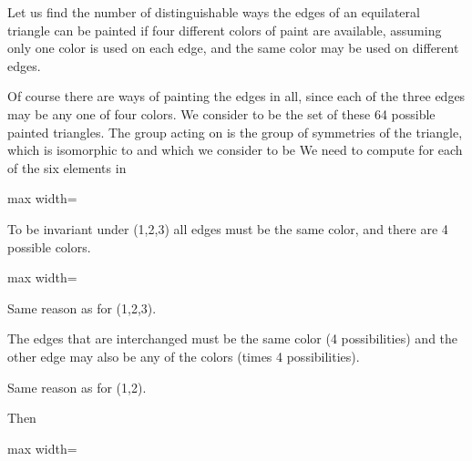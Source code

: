 \documentclass[11pt,oneside]{article}
\begin{document}
\begin{BookBody}

 Let us find the number of distinguishable ways the edges of an equilateral triangle can be painted if four different colors of paint are available, assuming only one color is used on each edge, and the same color may be used on different edges.

Of course there are  ways of painting the edges in all, since each of the three edges may be any one of four colors. We consider  to be the set of these 64 possible painted triangles. The group  acting on  is the group of symmetries of the triangle, which is isomorphic to  and which we consider to be  We need to compute  for each of the six elements  in 

\begin{center}\begin{adjustbox}{max width=\linewidth}\end{adjustbox}\end{center}

 To be invariant under (1,2,3) all edges must be the same color, and there are 4 possible colors.

\begin{center}\begin{adjustbox}{max width=\linewidth}\end{adjustbox}\end{center}

Same reason as for (1,2,3).

 The edges that are interchanged must be the same color (4 possibilities) and the other edge may also be any of the colors (times 4 possibilities).

 Same reason as for (1,2).

\noindent Then

\begin{center}\begin{adjustbox}{max width=\linewidth}\end{adjustbox}\end{center}


\end{BookBody}
\end{document}

